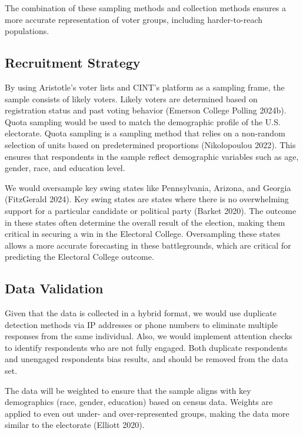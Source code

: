 \documentclass[
  letterpaper,
  DIV=11,
  numbers=noendperiod]{scrartcl}
\begin{document}
The combination of these sampling methods and collection methods ensures
a more accurate representation of voter groups, including
harder-to-reach populations.

\hypertarget{recruitment-strategy}{%
\subsection{Recruitment Strategy}\label{recruitment-strategy}}

By using Aristotle's voter lists and CINT's platform as a sampling
frame, the sample consists of likely voters. Likely voters are
determined based on registration status and past voting behavior
(Emerson College Polling 2024b). Quota sampling would be used to match
the demographic profile of the U.S. electorate. Quota sampling is a
sampling method that relies on a non-random selection of units based on
predetermined proportions (Nikolopoulou 2022). This ensures that
respondents in the sample reflect demographic variables such as age,
gender, race, and education level.

We would oversample key swing states like Pennsylvania, Arizona, and
Georgia (FitzGerald 2024). Key swing states are states where there is no
overwhelming support for a particular candidate or political party
(Barket 2020). The outcome in these states often determine the overall
result of the election, making them critical in securing a win in the
Electoral College. Oversampling these states allows a more accurate
forecasting in these battlegrounds, which are critical for predicting
the Electoral College outcome.

\hypertarget{data-validation}{%
\subsection{Data Validation}\label{data-validation}}

Given that the data is collected in a hybrid format, we would use
duplicate detection methods via IP addresses or phone numbers to
eliminate multiple responses from the same individual. Also, we would
implement attention checks to identify respondents who are not fully
engaged. Both duplicate respondents and unengaged respondents bias
results, and should be removed from the data set.

The data will be weighted to ensure that the sample aligns with key
demographics (race, gender, education) based on census data. Weights are
applied to even out under- and over-represented groups, making the data
more similar to the electorate (Elliott 2020).
\end{document}
